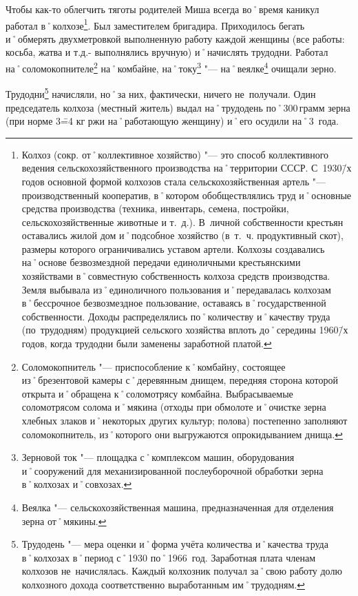 Чтобы как-то облегчить тяготы родителей Миша всегда во˚время каникул работал в˚колхозе\footnote
{Колхоз (сокр. от˚коллективное хозяйство) "--- это способ коллективного ведения сельскохозяйственного производства на˚территории СССР. С~1930\=/х годов основной формой колхозов стала сельскохозяйственная артель "--- производственный кооператив, в˚котором обобществлялись труд и˚основные средства производства (техника, инвентарь, семена, постройки, сельскохозяйственные животные и т.~д.). В~личной собственности крестьян оставались жилой дом и˚подсобное хозяйство (в~т.~ч. продуктивный скот), размеры которого ограничивались уставом артели. Колхозы создавались на˚основе безвозмездной передачи единоличными крестьянскими хозяйствами в˚совместную собственность колхоза средств производства. Земля выбывала из˚единоличного пользования и˚передавалась колхозам в˚бессрочное безвозмездное пользование, оставаясь в˚государственной собственности. Доходы распределялись по˚количеству и˚качеству труда (по~трудодням) продукцией сельского хозяйства вплоть до˚середины 1960\=/х годов, когда трудодни были заменены заработной платой.}. 
Был заместителем бригадира. Приходилось бегать и˚обмерять двухметровкой выполненную работу каждой женщины (все работы: косьба, жатва и т.д.- выполнялись вручную) и˚начислять трудодни. Работал на˚соломокопнителе\footnote
{Соломокопнитель "--- приспособление к˚комбайну, состоящее из˚брезентовой камеры с˚деревянным днищем, передняя сторона которой открыта и˚обращена к˚соломотрясу комбайна. Выбрасываемые соломотрясом солома и˚мякина (отходы при обмолоте и˚очистке зерна хлебных злаков и˚некоторых других культур; полова) постепенно заполняют соломокопнитель, из˚которого они выгружаются опрокидыванием днища.}
на˚комбайне, на˚току\footnote
{Зерновой ток "--- площадка с˚комплексом машин, оборудования и˚сооружений для механизированной послеуборочной обработки зерна в˚колхозах и˚совхозах.}
"--- на˚веялке\footnote
{Веялка "--- сельскохозяйственная машина, предназначенная для отделения зерна от˚мякины.} очищали зерно.

Трудодни\footnote{Трудодень "--- мера оценки и˚форма учёта количества и˚качества труда в˚колхозах в˚период с˚1930 по˚1966~год. Заработная плата членам колхозов не~начислялась. Каждый колхозник получал за˚свою работу долю колхозного дохода соответственно выработанным им˚трудодням.} начисляли, но˚за них, фактически, ничего не~получали. Один председатель колхоза (местный житель) выдал на˚трудодень по˚300\,грамм зерна (при норме 3\==4 кг ржи на˚работающую женщину) и˚его осудили на˚3~года.

